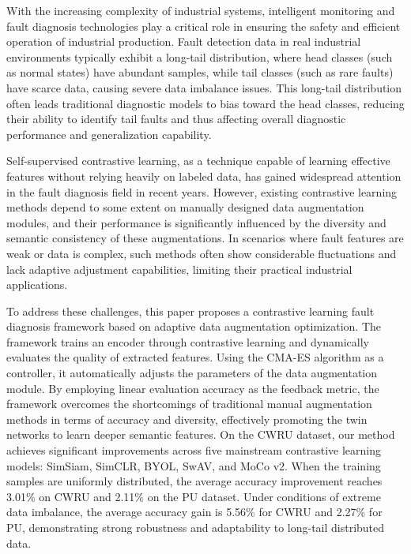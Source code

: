 \documentclass[master]{thesis-uestc}
\begin{document}
\begin{englishabstract}
    With the increasing complexity of industrial systems, intelligent monitoring and fault diagnosis technologies play a critical role in ensuring the safety and efficient operation of industrial production. Fault detection data in real industrial environments typically exhibit a long-tail distribution, where head classes (such as normal states) have abundant samples, while tail classes (such as rare faults) have scarce data, causing severe data imbalance issues. This long-tail distribution often leads traditional diagnostic models to bias toward the head classes, reducing their ability to identify tail faults and thus affecting overall diagnostic performance and generalization capability.

    Self-supervised contrastive learning, as a technique capable of learning effective features without relying heavily on labeled data, has gained widespread attention in the fault diagnosis field in recent years. However, existing contrastive learning methods depend to some extent on manually designed data augmentation modules, and their performance is significantly influenced by the diversity and semantic consistency of these augmentations. In scenarios where fault features are weak or data is complex, such methods often show considerable fluctuations and lack adaptive adjustment capabilities, limiting their practical industrial applications.

    To address these challenges, this paper proposes a contrastive learning fault diagnosis framework based on adaptive data augmentation optimization. The framework trains an encoder through contrastive learning and dynamically evaluates the quality of extracted features. Using the CMA-ES algorithm as a controller, it automatically adjusts the parameters of the data augmentation module. By employing linear evaluation accuracy as the feedback metric, the framework overcomes the shortcomings of traditional manual augmentation methods in terms of accuracy and diversity, effectively promoting the twin networks to learn deeper semantic features. On the CWRU dataset, our method achieves significant improvements across five mainstream contrastive learning models: SimSiam, SimCLR, BYOL, SwAV, and MoCo v2. When the training samples are uniformly distributed, the average accuracy improvement reaches 3.01\% on CWRU and 2.11\% on the PU dataset. Under conditions of extreme data imbalance, the average accuracy gain is 5.56\% for CWRU and 2.27\% for PU, demonstrating strong robustness and adaptability to long-tail distributed data.


\end{englishabstract}
\end{document}
